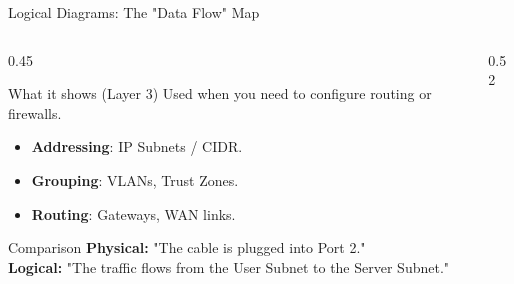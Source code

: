 \documentclass[aspectratio=169]{beamer}  %
\begin{document}
\begin{frame}{Logical Diagrams: The "Data Flow" Map}
    \begin{columns}[T]
        \begin{column}{0.45\textwidth}
            \begin{block}{What it shows (Layer 3)}
                \footnotesize
                Used when you need to configure routing or firewalls.
                \begin{itemize}
                    \item \textbf{Addressing}: IP Subnets / CIDR.
                    \item \textbf{Grouping}: VLANs, Trust Zones.
                    \item \textbf{Routing}: Gateways, WAN links.
                \end{itemize}
            \end{block}
            \begin{alertblock}{Comparison}
                \footnotesize
                \textbf{Physical:} "The cable is plugged into Port 2."\\
                \textbf{Logical:} "The traffic flows from the User Subnet to the Server Subnet."
            \end{alertblock}
        \end{column}
        \begin{column}{0.52\textwidth}
            \begin{center}
\end{center}
\end{column}
\end{columns}
\end{frame}
\end{document}
